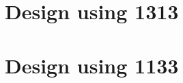 \section{Design using 1313}


 \begin{center}




 \end{center}



\section{Design using 1133}


 \begin{center}




 \end{center}



